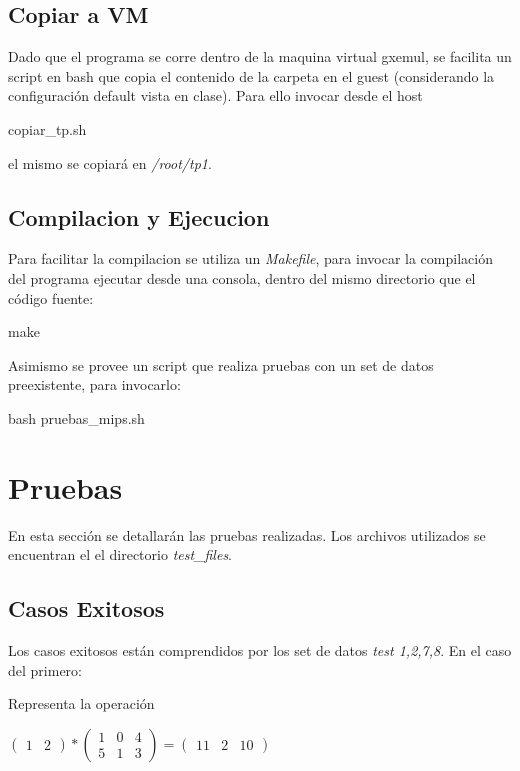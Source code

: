 \documentclass[10pt,a4paper]{article}
\begin{document}
	\subsection{Copiar a VM}
		Dado que el programa se corre dentro de la maquina virtual gxemul, se facilita un script en bash que copia el contenido de la carpeta en el guest (considerando la configuración default vista en clase). Para ello invocar desde el host
		\begin{bash}
		copiar_tp.sh
		\end{bash}
		 el mismo se copiará en \textit{/root/tp1}.

	\subsection{Compilacion y Ejecucion}
		Para facilitar la compilacion se utiliza un \textit{Makefile}, para invocar la compilación del programa ejecutar desde una consola, dentro del mismo directorio que el código fuente:
		\begin{bash}
		make
		\end{bash}

		Asimismo se provee un script que realiza pruebas con un set de datos preexistente, para invocarlo: 
		\begin{bash}
		bash pruebas_mips.sh
		\end{bash}

\section{Pruebas}
	En esta sección se detallarán las pruebas realizadas. Los archivos utilizados se encuentran el el directorio \textit{test\_files}.
	\subsection{Casos Exitosos}
		Los casos exitosos están comprendidos por los set de datos \textit{test 1,2,7,8}.	
		En el caso del	 primero:\	
	
		
	
		Representa la operación
		\begin{center}
		$\begin{pmatrix}
		1 & 2
		\end{pmatrix}
		*
		\begin{pmatrix}
		1 & 0 & 4 \\ 5 & 1 & 3
		\end{pmatrix}
		=
		\begin{pmatrix}
		11 & 2 & 10
		\end{pmatrix}
		$
		\end{center}
	
\end{document}
